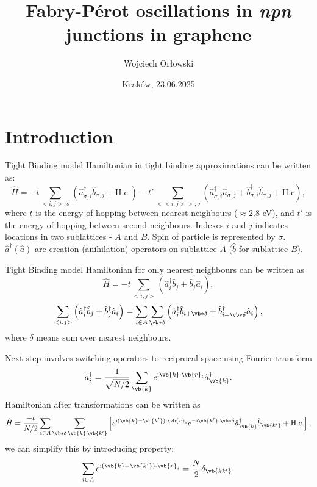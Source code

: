 \documentclass{beamer}
\author[Wojciech Orłowski]{Wojciech Orłowski}
\title[Project summary]{Fabry-Pérot oscillations in \textit{npn} junctions in graphene}
\date{Kraków, 23.06.2025}
\newcommand{\imag}{\text{i}}
\begin{document}
\frame{\titlepage}

\section{Introduction}
\begin{frame}{Tight Binding model}
	Hamiltonian in tight binding approximations can be written as:
	\begin{equation}
		\hat{H} = -t\sum_{<i,j>, \sigma}\left(\hat{a}^\dagger_{\sigma,i}\hat{b}_{\sigma,j} + \text{H.c.} \right) -t'\sum_{<<i,j>>,\sigma} \left(\hat{a}_{\sigma,i}^\dagger \hat{a}_{\sigma,j} + \hat{b}_{\sigma,i}^\dagger \hat{b}_{\sigma,j} + \text{H.c} \right),
	\end{equation}
	where $t$ is the energy of hopping between nearest neighbours ($\approx 2.8$ eV), and $t'$ is the energy of hopping between second neighbours.
	Indexes $i$ and $j$ indicates locations in two sublattices - $A$ and $B$.
	Spin of particle is represented by $\sigma$.
	$\hat{a}^\dagger (\hat{a})$ are creation (anihilation) operators on sublattice $A$ ($\hat{b}$ for sublattice $B$).
\end{frame}

\begin{frame}{Tight Binding model}
	Hamiltonian for only nearest neighbours can be written as
	\begin{equation}
		\hat{H} = -t\sum_{<i,j>}\left(\hat{a}^\dagger_{i}\hat{b}_{j} + \hat{b}_{j}^\dagger \hat{a}_{i}  \right),
	\end{equation}
	\begin{equation}
		\sum_{<i,j>}\left(\hat{a}^\dagger_{i}\hat{b}_{j} + \hat{b}_{j}^\dagger \hat{a}_{i}  \right) = \sum_{i\in A}\sum_{\vb*{\delta}}\left(\hat{a}^\dagger_{i}\hat{b}_{i+\vb*{\delta}} + \hat{b}_{i+\vb*{\delta}}^\dagger \hat{a}_{i}\right),
	\end{equation}
	where $\delta$ means sum over nearest neighbours.
\end{frame}

\begin{frame}
	Next step involves switching operators to reciprocal space using Fourier transform
	\begin{equation}
		\hat{a}^\dagger_i = \frac{1}{\sqrt{N/2}}\sum_{\vb{k}} e^{\imag\vb{k}\cdot\vb{r}_i}\hat{a}_{\vb{k}}^\dagger.
	\end{equation}
	Hamiltonian after transformations can be written as
	\begin{equation}
		\hat{H} = \frac{-t}{N/2}\sum_{i\in A}\sum_{\vb*{
				\delta}\, \vb{k}\, \vb{k'}}\left[e^{\imag (\vb{k} - \vb{k'})\cdot \vb{r}_i} e^{-\imag\vb{k'}\cdot \vb*{\delta}}\hat{a}^\dagger_{\vb{k}} \hat{b}_{\vb{k'}} + \text{H.c.}\right],
	\end{equation}
	we can simplify this by introducing property:
	\begin{equation}
		\sum_{i\in A} e^{\imag(\vb{k} - \vb{k'})\cdot \vb{r}_i} = \frac{N}{2}\delta_{\vb{kk'}}.
	\end{equation}
\end{frame}
\end{document}
